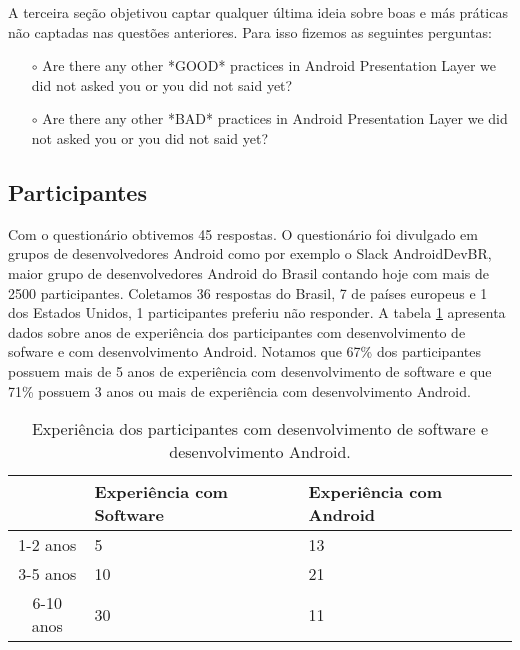 A terceira se\c{c}\~ao objetivou captar qualquer \'ultima ideia sobre boas e m\'as pr\'aticas n\~ao captadas nas quest\~oes anteriores. Para isso fizemos as seguintes perguntas: 

\begin{itemize} 
	\item[$\circ$] Are there any other *GOOD* practices in Android Presentation Layer we did not asked you or you did not said yet?
	\item[$\circ$] Are there any other *BAD* practices in Android Presentation Layer we did not asked you or you did not said yet?
\end{itemize}


\subsection{Participantes}
\label{sub:participantes}

Com o question\'ario obtivemos 45 respostas. O question\'ario foi divulgado em grupos de desenvolvedores Android como por exemplo o Slack AndroidDevBR, maior grupo de desenvolvedores Android do Brasil contando hoje com mais de 2500 participantes. Coletamos 36 respostas do Brasil, 7 de pa\'ises europeus e 1 dos Estados Unidos, 1 participantes preferiu n\~ao responder. A tabela \ref{tab:DadosDemograficos} apresenta dados sobre anos de experi\^encia dos participantes com desenvolvimento de sofware e com desenvolvimento Android. Notamos que 67\% dos participantes possuem mais de 5 anos de experi\^encia com desenvolvimento de software e que 71\% possuem 3 anos ou mais de experi\^encia com desenvolvimento Android.

\begin{table}[h]
\centering
\caption{Experi\^encia dos participantes com desenvolvimento de software e desenvolvimento Android.}
\begin{tabular}{c|p{2cm}p{2cm}}
& Experi\^encia com Software & Experi\^encia com Android \\
\hline
1-2 anos &	5  &	13 \\
3-5 anos &	10 &	21 \\
6-10 anos &	30 &	11 \\
\end{tabular}
\label{tab:DadosDemograficos}
\end{table}


